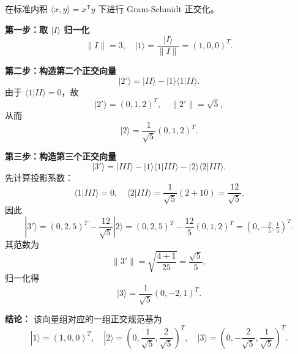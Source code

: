 \begin{solution}

\answer
在标准内积 $\langle x,y\rangle=x^\mathsf{T}y$ 下进行 Gram-Schmidt 正交化。

\textbf{第一步：取 $|I\rangle$ 归一化}
\[
\|I\|=3,\quad |1\rangle=\frac{|I\rangle}{\|I\|}=(1,0,0)^T.
\]

\textbf{第二步：构造第二个正交向量}
\[
|2'\rangle=|II\rangle-|1\rangle\langle 1|II\rangle.
\]
由于 $\langle 1|II\rangle=0$，故
\[
|2'\rangle=(0,1,2)^T,\quad \|2'\|=\sqrt{5},
\]
从而
\[
|2\rangle=\frac{1}{\sqrt{5}}(0,1,2)^T.
\]

\textbf{第三步：构造第三个正交向量}
\[
|3'\rangle=|III\rangle-|1\rangle\langle 1|III\rangle-|2\rangle\langle 2|III\rangle.
\]
先计算投影系数：
\[
\langle 1|III\rangle=0,\quad \langle 2|III\rangle=\frac{1}{\sqrt{5}}(2+10)=\frac{12}{\sqrt{5}}.
\]
因此
\[
|3'\rangle=(0,2,5)^T-\frac{12}{\sqrt{5}}|2\rangle
=(0,2,5)^T-\frac{12}{5}(0,1,2)^T=(0,-\tfrac{2}{5},\tfrac{1}{5})^T.
\]
其范数为
\[
\|3'\|=\sqrt{\frac{4+1}{25}}=\frac{\sqrt{5}}{5},
\]
归一化得
\[
|3\rangle=\frac{1}{\sqrt{5}}(0,-2,1)^T.
\]

\textbf{结论：}
该向量组对应的一组正交规范基为
\[
|1\rangle=(1,0,0)^T,\quad |2\rangle=\left(0,\frac{1}{\sqrt{5}},\frac{2}{\sqrt{5}}\right)^T,\quad
|3\rangle=\left(0,-\frac{2}{\sqrt{5}},\frac{1}{\sqrt{5}}\right)^T.
\]
\end{solution}



